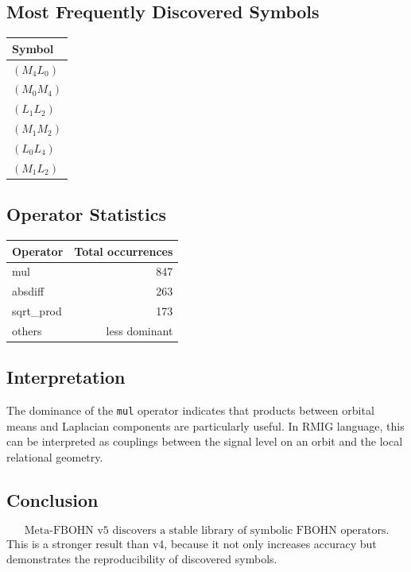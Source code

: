 \subsection{Most Frequently Discovered Symbols}
\begin{center}
\begin{tabular}{l}
\toprule
Symbol\\
\midrule
$(M_4L_0)$\\
$(M_0M_4)$\\
$(L_1L_2)$\\
$(M_1M_2)$\\
$(L_0L_4)$\\
$(M_1L_2)$\\
\bottomrule
\end{tabular}
\end{center}

\subsection{Operator Statistics}
\begin{center}
\begin{tabular}{lr}
\toprule
Operator & Total occurrences\\
\midrule
mul & 847\\
absdiff & 263\\
sqrt\_prod & 173\\
others & less dominant\\
\bottomrule
\end{tabular}
\end{center}

\subsection{Interpretation}
The dominance of the \texttt{mul} operator indicates that products between orbital means and Laplacian components are particularly useful. In RMIG language, this can be interpreted as couplings between the signal level on an orbit and the local relational geometry.

\subsection{Conclusion}
\[
\boxed{\text{Meta-FBOHN v5 discovers a stable library of symbolic FBOHN operators.}}
\]
This is a stronger result than v4, because it not only increases accuracy but demonstrates the reproducibility of discovered symbols.
